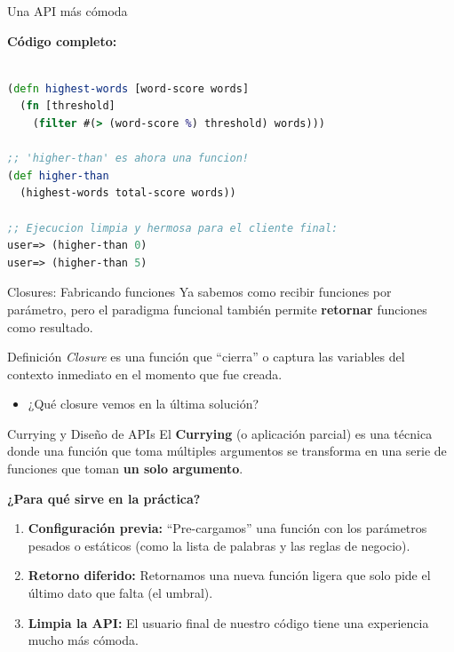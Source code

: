 \documentclass{beamer}
\begin{document}
\begin{frame}[fragile]{Una API más cómoda}

    \textbf{Código completo:} 

    \begin{lstlisting}[language=Clojure]

(defn highest-words [word-score words]
  (fn [threshold]
    (filter #(> (word-score %) threshold) words)))

;; 'higher-than' es ahora una funcion!
(def higher-than 
  (highest-words total-score words))

;; Ejecucion limpia y hermosa para el cliente final:
user=> (higher-than 0)
user=> (higher-than 5)
    \end{lstlisting}
\end{frame}

\begin{frame}{ Closures: Fabricando funciones}
    Ya sabemos como recibir funciones por parámetro, pero el paradigma funcional también permite \textbf{retornar} funciones como resultado.

    \vspace{0.3cm}

    \begin{block}{Definición}
    \textit{Closure} es una función que ``cierra'' o captura las variables del contexto inmediato en el momento que fue creada.
    \end{block}
    \begin{itemize}
        \item ¿Qué closure vemos en la última solución?
    \end{itemize}
    
\end{frame}


\begin{frame}{Currying y Diseño de APIs}
    El \textbf{Currying} (o aplicación parcial) es una técnica donde una función que toma múltiples argumentos se transforma en una serie de funciones que toman \textbf{un solo argumento}.
    
    \vspace{0.3cm}
    \textbf{¿Para qué sirve en la práctica?}
    \begin{enumerate}
        \item \textbf{Configuración previa:} ``Pre-cargamos'' una función con los parámetros pesados o estáticos (como la lista de palabras y las reglas de negocio).
        \item \textbf{Retorno diferido:} Retornamos una nueva función ligera que solo pide el último dato que falta (el umbral).
        \item \textbf{Limpia la API:} El usuario final de nuestro código tiene una experiencia mucho más cómoda.
    \end{enumerate}
\end{frame}
\end{document}
